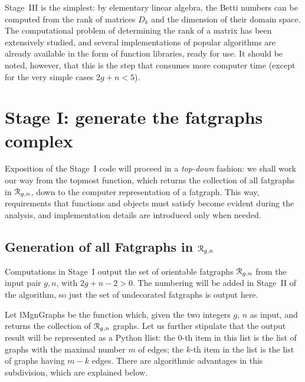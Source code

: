 Stage~III is the simplest: by elementary linear algebra, the Betti
numbers can be computed from the rank of matrices $D_k$ and the
dimension of their domain space.  The computational problem of
determining the rank of a matrix has been extensively studied, and
several implementations of popular algorithms are already available in
the form of function libraries, ready for use. It should be noted,
however, that this is the step that consumes more computer time
(except for the very simple cases $2g+n<5$).

\section[Stage I]{Stage I: generate the fatgraphs complex}
\label{sec:stage-i}

Exposition of the Stage~I code will proceed in a \emph{top-down}
fashion: we shall work our way from the topmost function, which
returns the collection of all fatgraphs in $\mathcal{R}_{g,n}$, down to the
computer representation of a fatgraph.  This way, requirements that
functions and objects must satisfy become evident during the analysis,
and implementation details are introduced only when needed.

\subsection{Generation of all Fatgraphs in $\mathcal{R}_{g,n}$}
\label{sec:stage1-all}

Computations in Stage~I output the set of orientable fatgraphs
$\mathcal{R}_{g,n}$ from the input pair $g, n$, with $2g +n - 2 > 0$.  The
numbering will be added in Stage~II of the algorithm, so just the set
of undecorated fatgraphs is output here.

Let \l{MgnGraphs} be the function which, given the two integers $g$,
$n$ as input, and returns the collection of $\mathcal{R}_{g,n}$ graphs.  Let us
further stipulate that the output result will be represented as a
Python \l{list}: the $0$-th item in this list is the list of graphs
with the maximal number $m$ of edges; the $k$-th item in the list is
the list of graphs having $m - k$ edges.  There are algorithmic
advantages in this subdivision, which are explained below.

